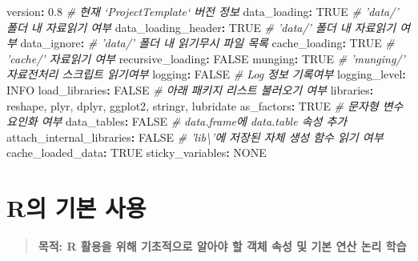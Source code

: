 \documentclass[11pt,a4paper]{book}
\newenvironment{Shaded}{\begin{snugshade}}{\end{snugshade}}
\newcommand{\FloatTok}[1]{\textcolor[rgb]{0.00,0.00,0.81}{#1}}
\newcommand{\StringTok}[1]{\textcolor[rgb]{0.31,0.60,0.02}{#1}}
\newcommand{\CommentTok}[1]{\textcolor[rgb]{0.56,0.35,0.01}{\textit{#1}}}
\newcommand{\OtherTok}[1]{\textcolor[rgb]{0.56,0.35,0.01}{#1}}
\newcommand{\OperatorTok}[1]{\textcolor[rgb]{0.81,0.36,0.00}{\textbf{#1}}}
\newcommand{\NormalTok}[1]{#1}
\theoremstyle{definition}
\theoremstyle{definition}
\theoremstyle{definition}
\theoremstyle{remark}
\begin{document}
\begin{Shaded}
\begin{Highlighting}[]
\NormalTok{version}\OperatorTok{:}\StringTok{ }\FloatTok{0.8} \CommentTok{# 현재 `ProjectTemplate` 버전 정보}
\NormalTok{data_loading}\OperatorTok{:}\StringTok{ }\OtherTok{TRUE} \CommentTok{# 'data/' 폴더 내 자료읽기 여부 }
\NormalTok{data_loading_header}\OperatorTok{:}\StringTok{ }\OtherTok{TRUE} \CommentTok{# 'data/' 폴더 내 자료읽기 여부 }
\NormalTok{data_ignore}\OperatorTok{:}\StringTok{ }\CommentTok{# 'data/' 폴더 내 읽기무시 파일 목록}
\NormalTok{cache_loading}\OperatorTok{:}\StringTok{ }\OtherTok{TRUE} \CommentTok{# 'cache/' 자료읽기 여부}
\NormalTok{recursive_loading}\OperatorTok{:}\StringTok{ }\OtherTok{FALSE}
\NormalTok{munging}\OperatorTok{:}\StringTok{ }\OtherTok{TRUE} \CommentTok{# 'munging/' 자료전처리 스크립트 읽기여부}
\NormalTok{logging}\OperatorTok{:}\StringTok{ }\OtherTok{FALSE} \CommentTok{# Log 정보 기록여부 }
\NormalTok{logging_level}\OperatorTok{:}\StringTok{ }\NormalTok{INFO}
\NormalTok{load_libraries}\OperatorTok{:}\StringTok{ }\OtherTok{FALSE} \CommentTok{# 아래 패키지 리스트 불러오기 여부}
\NormalTok{libraries}\OperatorTok{:}\StringTok{ }\NormalTok{reshape, plyr, dplyr, ggplot2, stringr, lubridate}
\NormalTok{as_factors}\OperatorTok{:}\StringTok{ }\OtherTok{TRUE} \CommentTok{# 문자형 변수 요인화 여부}
\NormalTok{data_tables}\OperatorTok{:}\StringTok{ }\OtherTok{FALSE} \CommentTok{# data.frame에 data.table 속성 추가}
\NormalTok{attach_internal_libraries}\OperatorTok{:}\StringTok{ }\OtherTok{FALSE} \CommentTok{# 'lib\textbackslash{}'에 저장된 자체 생성 함수 읽기 여부}
\NormalTok{cache_loaded_data}\OperatorTok{:}\StringTok{  }\OtherTok{TRUE} 
\NormalTok{sticky_variables}\OperatorTok{:}\StringTok{ }\NormalTok{NONE}
\end{Highlighting}
\end{Shaded}

\normalsize

\chapter{R의 기본 사용}\label{r--}

\begin{quote}
\colorbox{gray!10}{\begin{minipage}{15cm}
\textbf{목적: R 활용을 위해 기초적으로 알아야 할 객체 속성 및 기본 연산 논리 학습}
\end{minipage}}
\end{quote}

\vspace{0.5cm}
\end{document}
